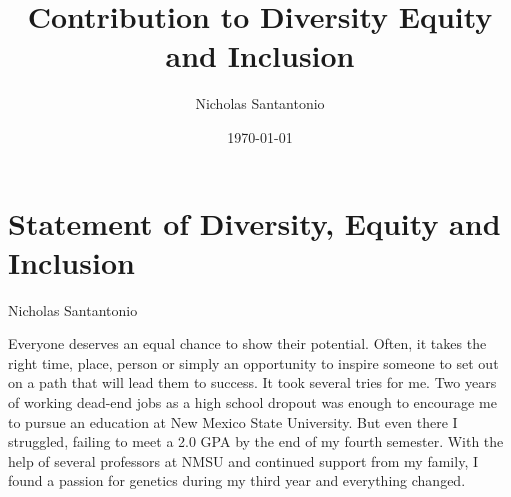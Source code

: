 \documentclass[11pt]{article}
\title{Contribution to Diversity Equity and Inclusion}
\author{Nicholas Santantonio}
\date{\today}
\newcommand{\amy}[1]{{\color{amyCol} [\textbf{Amy:} #1]}}
\begin{document}

\section*{\centering Statement of Diversity, Equity and Inclusion}
\begin{center} Nicholas Santantonio \end{center}


\noindent {}

\medskip

Everyone deserves an equal chance to show their potential. Often, it takes the right time, place, person or simply an opportunity to inspire someone to set out on a path that will lead them to success. It took several tries for me. Two years of working dead-end jobs as a high school dropout was enough to encourage me to pursue an education at New Mexico State University. But even there I struggled, failing to meet a 2.0 GPA by the end of my fourth semester. With the help of several professors at NMSU and continued support from my family, I found a passion for genetics during my third year and everything changed.
\end{document}
